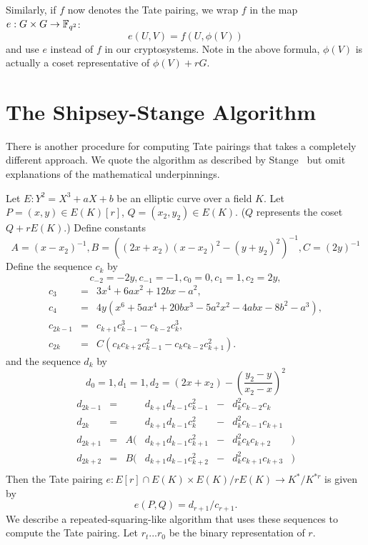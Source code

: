 Similarly, if $f$ now denotes the Tate pairing,
we wrap $f$ in the map
$e : G\times G \rightarrow \mathbb{F}_{q^2}$:
\[ e(U, V) = f(U, \phi(V)) \]
and use $e$ instead of $f$ in our cryptosystems. Note in the above
formula, $\phi(V)$ is actually a coset representative of $\phi(V) + rG$.

\section {The Shipsey-Stange Algorithm}
There is another procedure for computing Tate pairings that takes a completely
different approach. We quote the algorithm as described by Stange~\cite{stange}
but omit explanations of the mathematical underpinnings.

Let $E:Y^2 = X^3 + aX + b$ be an elliptic curve over a field $K$.
Let $P=(x, y) \in E(K)[r]$, $Q=(x_2, y_2) \in E(K)$. ($Q$ represents the
coset $Q + rE(K)$.)
Define constants
\[
    A = (x - x_2)^{-1},
    B = \left((2x + x_2)(x - x_2)^2 - (y + y_2)^2\right)^{-1},
    C = (2 y)^{-1}
\]
Define the sequence $c_k$ by
\[
    c_{-2} = -2y,
    c_{-1} = -1,
    c_0 = 0,
    c_1 = 1,
    c_2 = 2 y,
\]
\[
\begin{array}{lcl}
    c_3 &=& 3 x^4 + 6ax^2 + 12bx - a^2, \\
    c_4 &=& 4y(x^6+5ax^4+20bx^3-5a^2x^2-4abx-8b^2-a^3), \\
    c_{2k-1} &=& c_{k+1} c_{k-1}^3 - c_{k-2} c_k^3, \\
    c_{2k} &=& C(c_k c_{k+2} c_{k-1}^2 - c_k c_{k-2} c_{k+1}^2).
\end{array}
\]
and the sequence $d_k$ by
\[
    d_0 = 1,
    d_1 = 1,
    d_2 = (2x+x_2) - \left( \frac{y_2-y}{x_2-x} \right) ^2
\]
\[
\begin{array}{lcrlcll}
    d_{2k-1} &=& & d_{k+1} d_{k-1} c_{k-1}^2 &-& d_k^2 c_{k-2} c_{k}& \\ 
    d_{2k} &=& & d_{k+1} d_{k-1} c_{k}^2 &-& d_k^2 c_{k-1} c_{k+1}& \\
    d_{2k+1} &=& A(& d_{k+1} d_{k-1} c_{k+1}^2 &-& d_k^2 c_{k} c_{k+2}&) \\
    d_{2k+2} &=& B(& d_{k+1} d_{k-1} c_{k+2}^2 &-& d_k^2 c_{k+1} c_{k+3}&) \\
\end{array}
\]
Then the Tate pairing
$
e : E[r] \cap E(K) \times
E(K) / r E(K) \rightarrow
K^* / K^{*r}
$
is given by
\[
e(P,Q) = d_{r+1}/c_{r+1}.
\]
We describe a repeated-squaring-like algorithm that uses these sequences
to compute the Tate pairing.
Let $r_t ... r_0$ be the binary representation of $r$.

